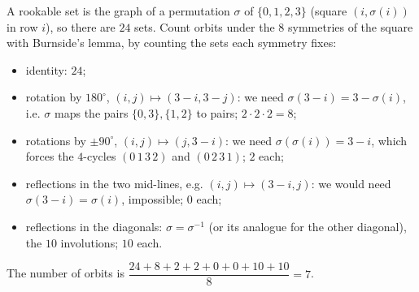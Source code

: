 A rookable set is the graph of a permutation $\sigma$ of $\{0,1,2,3\}$ (square $(i,\sigma(i))$ in row $i$), so there are $24$ sets. Count orbits under the $8$ symmetries of the square with Burnside's lemma, by counting the sets each symmetry fixes:
\begin{itemize}
\item identity: $24$;
\item rotation by $180^\circ$, $(i,j)\mapsto(3-i,3-j)$: we need $\sigma(3-i)=3-\sigma(i)$, i.e. $\sigma$ maps the pairs $\{0,3\},\{1,2\}$ to pairs; $2\cdot2\cdot2=8$;
\item rotations by $\pm90^\circ$, $(i,j)\mapsto(j,3-i)$: we need $\sigma(\sigma(i))=3-i$, which forces the $4$-cycles $(0\,1\,3\,2)$ and $(0\,2\,3\,1)$; $2$ each;
\item reflections in the two mid-lines, e.g. $(i,j)\mapsto(3-i,j)$: we would need $\sigma(3-i)=\sigma(i)$, impossible; $0$ each;
\item reflections in the diagonals: $\sigma=\sigma^{-1}$ (or its analogue for the other diagonal), the $10$ involutions; $10$ each.
\end{itemize}
The number of orbits is $\dfrac{24+8+2+2+0+0+10+10}{8}=\boxed{7}$.

